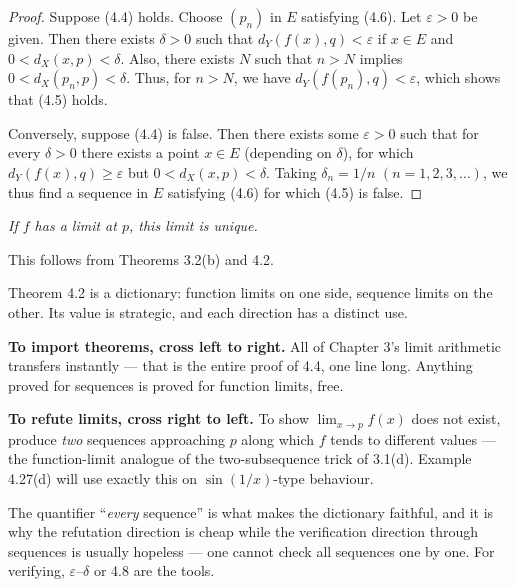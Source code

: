 \begin{proof}
Suppose (4.4) holds. Choose $(p_n)$ in $E$ satisfying (4.6). Let
$\varepsilon > 0$ be given. Then there exists $\delta > 0$ such that
$d_Y(f(x),q) < \varepsilon$ if $x \in E$ and $0 < d_X(x,p) < \delta$. Also,
there exists $N$ such that $n > N$ implies $0 < d_X(p_n,p) < \delta$. Thus,
for $n > N$, we have $d_Y(f(p_n),q) < \varepsilon$, which shows that (4.5)
holds.

Conversely, suppose (4.4) is false. Then there exists some $\varepsilon > 0$
such that for every $\delta > 0$ there exists a point $x \in E$ (depending on
$\delta$), for which $d_Y(f(x),q) \ge \varepsilon$ but
$0 < d_X(x,p) < \delta$. Taking $\delta_n = 1/n$ $(n = 1,2,3,\dots)$, we thus
find a sequence in $E$ satisfying (4.6) for which (4.5) is
false.
\end{proof}

\emph{If $f$ has a limit at $p$, this limit is unique.}

This follows from Theorems 3.2(b) and 4.2.

\begin{deeper}
Theorem 4.2 is a dictionary: function limits on one side, sequence limits on
the other. Its value is strategic, and each direction has a distinct use.

\smallskip
\textbf{To import theorems, cross left to right.} All of Chapter 3's limit
arithmetic transfers instantly --- that is the entire proof of 4.4, one line
long. Anything proved for sequences is proved for function limits, free.

\smallskip
\textbf{To refute limits, cross right to left.} To show $\lim_{x\to p} f(x)$
does not exist, produce \emph{two} sequences approaching $p$ along which $f$
tends to different values --- the function-limit analogue of the
two-subsequence trick of 3.1(d). Example 4.27(d) will use exactly this on
$\sin(1/x)$-type behaviour.

\smallskip
The quantifier ``\emph{every} sequence'' is what makes the dictionary
faithful, and it is why the refutation direction is cheap while the
verification direction through sequences is usually hopeless --- one cannot
check all sequences one by one. For verifying, $\varepsilon$--$\delta$ or 4.8
are the tools.
\end{deeper}

